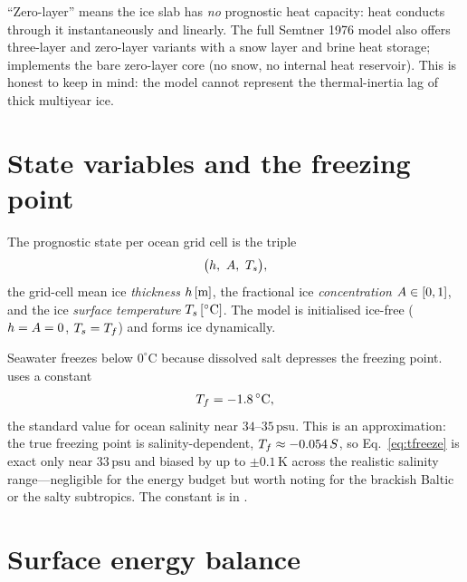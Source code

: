 \begin{remark}
``Zero-layer'' means the ice slab has \emph{no} prognostic heat capacity: heat
conducts through it instantaneously and linearly. The full Semtner 1976 model
also offers three-layer and zero-layer variants with a snow layer and brine heat
storage; \model{} implements the bare zero-layer core (no snow, no internal heat
reservoir). This is honest to keep in mind: the model cannot represent the
thermal-inertia lag of thick multiyear ice.
\end{remark}

\section{State variables and the freezing point}

The prognostic state per ocean grid cell is the triple
\begin{equation}
  \bigl(h,\ A,\ T_{s}\bigr),
\end{equation}
the grid-cell mean ice \emph{thickness} $h\,[\mathrm{m}]$, the fractional
ice \emph{concentration} $A\in[0,1]$, and the ice \emph{surface
temperature} $T_{s}\,[^\circ\mathrm{C}]$. The model is initialised ice-free
($h=A=0$, $T_{s}=T_{f}$) and forms ice dynamically.

Seawater freezes below $0^\circ\mathrm{C}$ because dissolved salt depresses the
freezing point. \model{} uses a constant
\begin{equation}
  T_{f} = -1.8\,^\circ\mathrm{C},
  \label{eq:tfreeze}
\end{equation}
the standard value for ocean salinity near $34$--$35\,\mathrm{psu}$. This is an
approximation: the true freezing point is salinity-dependent,
$T_{f} \approx -0.054\,S$, so Eq.~\eqref{eq:tfreeze} is exact only near
$33\,\mathrm{psu}$ and biased by up to $\pm 0.1\,\mathrm{K}$ across the realistic
salinity range---negligible for the energy budget but worth noting for the
brackish Baltic or the salty subtropics. The constant is  in
.

\section{Surface energy balance}

